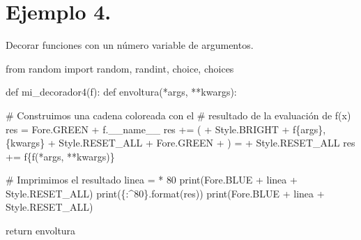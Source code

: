 \documentclass[
  letterpaper,
  DIV=11,
  numbers=noendperiod]{scrreprt}
\newenvironment{Shaded}{\begin{snugshade}}{\end{snugshade}}
\newcommand{\BuiltInTok}[1]{\textcolor[rgb]{0.00,0.23,0.31}{#1}}
\newcommand{\CommentTok}[1]{\textcolor[rgb]{0.37,0.37,0.37}{#1}}
\newcommand{\ControlFlowTok}[1]{\textcolor[rgb]{0.00,0.23,0.31}{#1}}
\newcommand{\DecValTok}[1]{\textcolor[rgb]{0.68,0.00,0.00}{#1}}
\newcommand{\ImportTok}[1]{\textcolor[rgb]{0.00,0.46,0.62}{#1}}
\newcommand{\KeywordTok}[1]{\textcolor[rgb]{0.00,0.23,0.31}{#1}}
\newcommand{\NormalTok}[1]{\textcolor[rgb]{0.00,0.23,0.31}{#1}}
\newcommand{\OperatorTok}[1]{\textcolor[rgb]{0.37,0.37,0.37}{#1}}
\newcommand{\SpecialCharTok}[1]{\textcolor[rgb]{0.37,0.37,0.37}{#1}}
\newcommand{\SpecialStringTok}[1]{\textcolor[rgb]{0.13,0.47,0.30}{#1}}
\newcommand{\StringTok}[1]{\textcolor[rgb]{0.13,0.47,0.30}{#1}}
\newcommand{\VariableTok}[1]{\textcolor[rgb]{0.07,0.07,0.07}{#1}}
\begin{document}
\section{\texorpdfstring{\textbf{Ejemplo
4.}}{Ejemplo 4.}}\label{ejemplo-4.-3}

Decorar funciones con un número variable de argumentos.

\begin{Shaded}
\begin{Highlighting}[]
\ImportTok{from}\NormalTok{ random }\ImportTok{import}\NormalTok{ random, randint, choice, choices}

\KeywordTok{def}\NormalTok{ mi\_decorador4(f):}
    \KeywordTok{def}\NormalTok{ envoltura(}\OperatorTok{*}\NormalTok{args, }\OperatorTok{**}\NormalTok{kwargs):}

        \CommentTok{\# Construimos una cadena coloreada con el }
        \CommentTok{\# resultado de la evaluación de f(x)}
\NormalTok{        res }\OperatorTok{=}\NormalTok{ Fore.GREEN }\OperatorTok{+}\NormalTok{ f.}\VariableTok{\_\_name\_\_} 
\NormalTok{        res }\OperatorTok{+=} \StringTok{\textquotesingle{}(\textquotesingle{}} \OperatorTok{+}\NormalTok{ Style.BRIGHT }\OperatorTok{+} \SpecialStringTok{f\textquotesingle{}}\SpecialCharTok{\{}\NormalTok{args}\SpecialCharTok{\}}\SpecialStringTok{,}\SpecialCharTok{\{}\NormalTok{kwargs}\SpecialCharTok{\}}\SpecialStringTok{\textquotesingle{}} \OperatorTok{+}\NormalTok{ Style.RESET\_ALL }\OperatorTok{+}\NormalTok{ Fore.GREEN }\OperatorTok{+} \StringTok{\textquotesingle{}) = \textquotesingle{}} \OperatorTok{+}\NormalTok{ Style.RESET\_ALL}
\NormalTok{        res }\OperatorTok{+=} \SpecialStringTok{f\textquotesingle{}}\SpecialCharTok{\{}\NormalTok{f(}\OperatorTok{*}\NormalTok{args, }\OperatorTok{**}\NormalTok{kwargs)}\SpecialCharTok{\}}\SpecialStringTok{\textquotesingle{}}
        
        \CommentTok{\# Imprimimos el resultado}
\NormalTok{        linea }\OperatorTok{=} \StringTok{\textquotesingle{}{-}\textquotesingle{}} \OperatorTok{*} \DecValTok{80}
        \BuiltInTok{print}\NormalTok{(Fore.BLUE }\OperatorTok{+}\NormalTok{ linea }\OperatorTok{+}\NormalTok{ Style.RESET\_ALL)}
        \BuiltInTok{print}\NormalTok{(}\StringTok{\textquotesingle{}}\SpecialCharTok{\{:\^{}80\}}\StringTok{\textquotesingle{}}\NormalTok{.}\BuiltInTok{format}\NormalTok{(res))}
        \BuiltInTok{print}\NormalTok{(Fore.BLUE }\OperatorTok{+}\NormalTok{ linea }\OperatorTok{+}\NormalTok{ Style.RESET\_ALL)}
        
    \ControlFlowTok{return}\NormalTok{ envoltura}


\end{Highlighting}
\end{Shaded}
\end{document}
